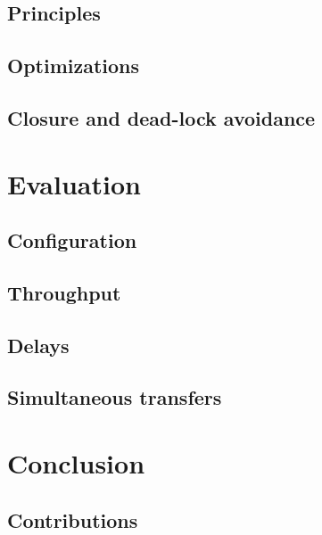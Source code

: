 \documentclass[journal]{IEEEtran}
\begin{document}
\subsection{Principles}



\subsection{Optimizations}



\subsection{Closure and dead-lock avoidance}






\section{Evaluation}


\subsection{Configuration}

\subsection{Throughput}





\subsection{Delays}

\subsection{Simultaneous transfers}






\section{Conclusion}

\subsection{Contributions}
\end{document}
